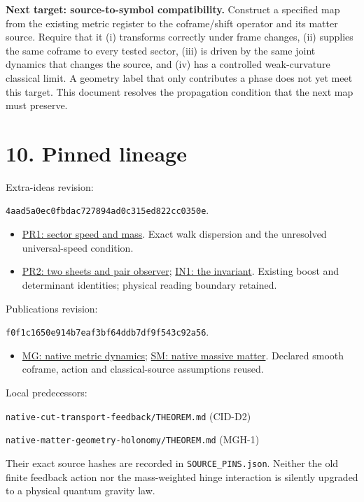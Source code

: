 \documentclass[11pt,a4paper]{article}
\begin{document}
\textbf{Next target: source-to-symbol compatibility.} Construct a specified map from the existing metric register to the coframe/shift operator and its matter source. Require that it (i) transforms correctly under frame changes, (ii) supplies the same coframe to every tested sector, (iii) is driven by the same joint dynamics that changes the source, and (iv) has a controlled weak-curvature classical limit. A geometry label that only contributes a phase does not yet meet this target. This document resolves the propagation condition that the next map must preserve.

\newpage
\section*{10. Pinned lineage}
Extra-ideas revision:\par\texttt{4aad5a0ec0fbdac727894ad0c315ed822cc0350e}.
\begin{itemize}
\item \href{https://github.com/Parveen117/extra-ideas/blob/4aad5a0ec0fbdac727894ad0c315ed822cc0350e/physics/pr1/PR1_SECTOR_SPEED_AND_MASS.md}{PR1: sector speed and mass}. Exact walk dispersion and the unresolved universal-speed condition.
\item \href{https://github.com/Parveen117/extra-ideas/blob/4aad5a0ec0fbdac727894ad0c315ed822cc0350e/physics/pr2/PR2_TWO_SHEETS_PAIR_OBSERVER.md}{PR2: two sheets and pair observer}; \href{https://github.com/Parveen117/extra-ideas/blob/4aad5a0ec0fbdac727894ad0c315ed822cc0350e/physics/in1/IN1_THE_INVARIANT.md}{IN1: the invariant}. Existing boost and determinant identities; physical reading boundary retained.
\end{itemize}
Publications revision:\par\texttt{f0f1c1650e914b7eaf3bf64ddb7df9f543c92a56}.
\begin{itemize}
\item \href{https://github.com/Parveen117/Publications/blob/f0f1c1650e914b7eaf3bf64ddb7df9f543c92a56/papers/ugd-kahler-propagation/NATIVE_METRIC_DYNAMICS.md}{MG: native metric dynamics}; \href{https://github.com/Parveen117/Publications/blob/f0f1c1650e914b7eaf3bf64ddb7df9f543c92a56/papers/ugd-kahler-propagation/NATIVE_MASSIVE_MATTER.md}{SM: native massive matter}. Declared smooth coframe, action and classical-source assumptions reused.
\end{itemize}
Local predecessors:\par
{\small\texttt{native-cut-transport-feedback/THEOREM.md} (CID-D2)\par
\texttt{native-matter-geometry-holonomy/THEOREM.md} (MGH-1)}\par
Their exact source hashes are recorded in \texttt{SOURCE\_PINS.json}. Neither the old finite feedback action nor the mass-weighted hinge interaction is silently upgraded to a physical quantum gravity law.
\end{document}
